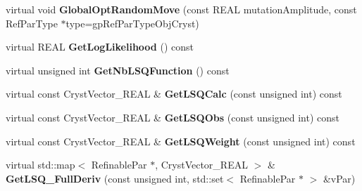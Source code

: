 \begin{DoxyCompactItemize}
\item 
\mbox{\label{class_obj_cryst_1_1_diffraction_data_single_crystal_a896f54524e60ee1d1606ee3bfe06c1d8}} 
virtual void {\bfseries Global\+Opt\+Random\+Move} (const R\+E\+AL mutation\+Amplitude, const Ref\+Par\+Type $\ast$type=gp\+Ref\+Par\+Type\+Obj\+Cryst)
\item 
\mbox{\label{class_obj_cryst_1_1_diffraction_data_single_crystal_a7fd5a263195e9f6ea7629d4f8cebae4f}} 
virtual R\+E\+AL {\bfseries Get\+Log\+Likelihood} () const
\item 
\mbox{\label{class_obj_cryst_1_1_diffraction_data_single_crystal_a98d2bca605b66f84f72c9b24c59f5688}} 
virtual unsigned int {\bfseries Get\+Nb\+L\+S\+Q\+Function} () const
\item 
\mbox{\label{class_obj_cryst_1_1_diffraction_data_single_crystal_acbc4825ffac223797b60f3760eb25a36}} 
virtual const Cryst\+Vector\+\_\+\+R\+E\+AL \& {\bfseries Get\+L\+S\+Q\+Calc} (const unsigned int) const
\item 
\mbox{\label{class_obj_cryst_1_1_diffraction_data_single_crystal_a449fba25b0d43ae4708a951600a3fb36}} 
virtual const Cryst\+Vector\+\_\+\+R\+E\+AL \& {\bfseries Get\+L\+S\+Q\+Obs} (const unsigned int) const
\item 
\mbox{\label{class_obj_cryst_1_1_diffraction_data_single_crystal_a43fd37c07965893b2679c223fda233f9}} 
virtual const Cryst\+Vector\+\_\+\+R\+E\+AL \& {\bfseries Get\+L\+S\+Q\+Weight} (const unsigned int) const
\item 
\mbox{\label{class_obj_cryst_1_1_diffraction_data_single_crystal_a5e542f0fcbf6e8cf44c31e61960a50a6}} 
virtual std\+::map$<$ Refinable\+Par $\ast$, Cryst\+Vector\+\_\+\+R\+E\+AL $>$ \& {\bfseries Get\+L\+S\+Q\+\_\+\+Full\+Deriv} (const unsigned int, std\+::set$<$ Refinable\+Par $\ast$ $>$ \&v\+Par)
\item 
\mbox{\label{class_obj_cryst_1_1_diffraction_data_single_crystal_a8d9ff363dbd0bdf00c4e60f8d9f9cd84}} 

\end{DoxyCompactItemize}
